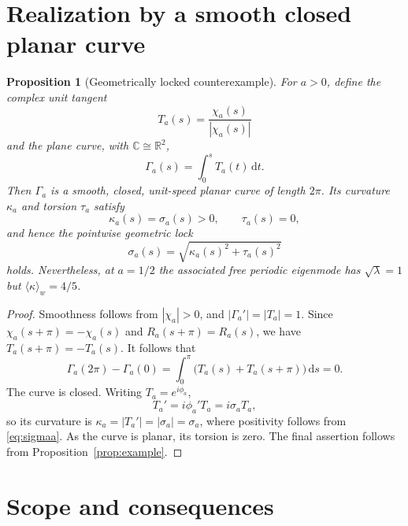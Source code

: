 \documentclass[11pt]{article}
\newtheorem{proposition}{Proposition}
\newcommand{\dd}{\,\mathrm{d}}
\newcommand{\avg}[1]{\langle #1\rangle_w}
\begin{document}
\section{Realization by a smooth closed planar curve}

\begin{proposition}[Geometrically locked counterexample]
\label{prop:curve}
For $a>0$, define the complex unit tangent
\begin{equation}
    T_a(s)=\frac{\chi_a(s)}{|\chi_a(s)|}
\end{equation}
and the plane curve, with $\mathbb{C}\cong\mathbb{R}^2$,
\begin{equation}
    \Gamma_a(s)=\int_0^s T_a(t)\dd t.
\end{equation}
Then $\Gamma_a$ is a smooth, closed, unit-speed planar curve of
length $2\pi$.  Its curvature $\kappa_a$ and torsion $\tau_a$ satisfy
\begin{equation}
    \kappa_a(s)=\sigma_a(s)>0,\qquad \tau_a(s)=0,
\end{equation}
and hence the pointwise geometric lock
\begin{equation}
    \sigma_a(s)=\sqrt{\kappa_a(s)^2+\tau_a(s)^2}
\end{equation}
holds.  Nevertheless, at $a=1/2$ the associated free periodic
eigenmode has $\sqrt{\lambda}=1$ but
$\avg{\kappa}=4/5$.
\end{proposition}

\begin{proof}
Smoothness follows from $|\chi_a|>0$, and
$|\Gamma_a'|=|T_a|=1$.  Since
$\chi_a(s+\pi)=-\chi_a(s)$ and $R_a(s+\pi)=R_a(s)$,
we have $T_a(s+\pi)=-T_a(s)$.  It follows that
\begin{equation}
    \Gamma_a(2\pi)-\Gamma_a(0)
    =\int_0^\pi\bigl(T_a(s)+T_a(s+\pi)\bigr)\dd s=0.
\end{equation}
The curve is closed.  Writing $T_a=e^{i\phi_a}$,
\begin{equation}
    T_a'=i\phi_a'T_a=i\sigma_a T_a,
\end{equation}
so its curvature is $\kappa_a=|T_a'|=|\sigma_a|=\sigma_a$,
where positivity follows from \eqref{eq:sigmaa}.  As the curve is
planar, its torsion is zero.  The final assertion follows from
Proposition~\ref{prop:example}.
\end{proof}

\section{Scope and consequences}
\end{document}
